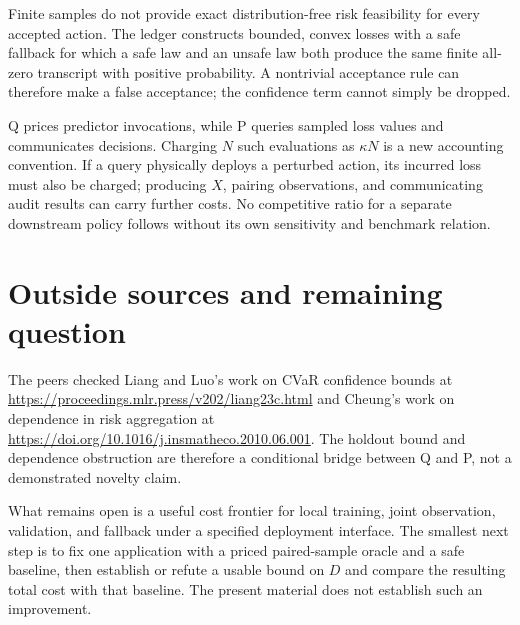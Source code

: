 \documentclass{article}
\begin{document}
Finite samples do not provide exact distribution-free risk feasibility for every accepted action. The ledger constructs bounded, convex losses with a safe fallback for which a safe law and an unsafe law both produce the same finite all-zero transcript with positive probability. A nontrivial acceptance rule can therefore make a false acceptance; the confidence term cannot simply be dropped. 

Q prices predictor invocations, while P queries sampled loss values and communicates decisions. Charging \(N\) such evaluations as \(\kappa N\) is a new accounting convention. If a query physically deploys a perturbed action, its incurred loss must also be charged; producing \(X\), pairing observations, and communicating audit results can carry further costs. No competitive ratio for a separate downstream policy follows without its own sensitivity and benchmark relation. 

\section*{Outside sources and remaining question}

The peers checked Liang and Luo's work on CVaR confidence bounds at
\url{https://proceedings.mlr.press/v202/liang23c.html}
and Cheung's work on dependence in risk aggregation at
\url{https://doi.org/10.1016/j.insmatheco.2010.06.001}.
The holdout bound and dependence obstruction are therefore a conditional bridge between Q and P, not a demonstrated novelty claim. 

What remains open is a useful cost frontier for local training, joint observation, validation, and fallback under a specified deployment interface. The smallest next step is to fix one application with a priced paired-sample oracle and a safe baseline, then establish or refute a usable bound on \(D\) and compare the resulting total cost with that baseline. The present material does not establish such an improvement. 
\end{document}
